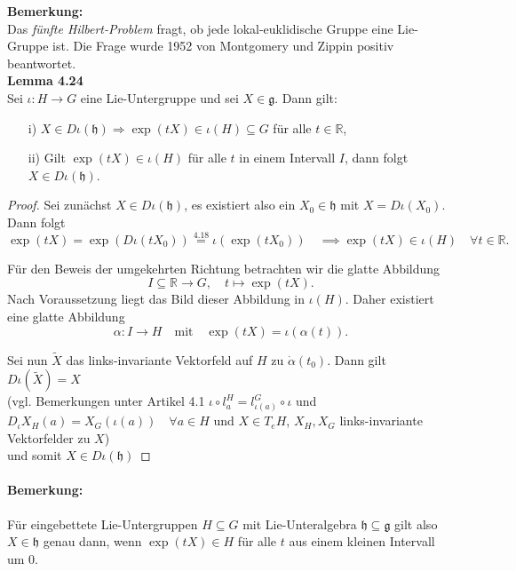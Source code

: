 \documentclass[fleqn, 12pt, letterpaper]{article}
\begin{document}
\textbf{Bemerkung:}\\
Das \emph{fünfte Hilbert-Problem} fragt, ob jede lokal-euklidische Gruppe eine Lie-Gruppe ist. Die Frage wurde 1952 von Montgomery und Zippin positiv beantwortet.\\

\textbf{Lemma 4.24}\\
Sei $\iota \colon H \to G$ eine Lie-Untergruppe und sei $X \in \mathfrak{g}$. Dann gilt:
\begin{itemize}
    \item[i)] $X \in D\iota(\mathfrak{h}) \Rightarrow \exp(tX) \in \iota(H) \subseteq G$ für alle $t \in \mathbb{R}$,
    \item[ii)] Gilt $\exp(tX) \in \iota(H)$ für alle $t$ in einem Intervall $I$, dann folgt $X \in D{\iota}(\mathfrak{h})$.
\end{itemize}

\begin{proof}
    Sei zunächst $X \in D\iota(\mathfrak{h})$, es existiert also ein $X_0 \in \mathfrak{h}$ mit $X = D{\iota}(X_0)$. Dann folgt
\[
\exp(tX) = \exp\left( D{\iota}(tX_0) \right) \overset{\text{4.18}}{=} \iota(\exp(tX_0)) \quad \implies \exp(tX) \in \iota(H) \quad \forall t \in \mathbb{R}.
\]

Für den Beweis der umgekehrten Richtung betrachten wir die glatte Abbildung
\[
I \subseteq \mathbb{R} \to G, \quad t \mapsto \exp(tX).
\]
Nach Voraussetzung liegt das Bild dieser Abbildung in $\iota(H)$. Daher existiert eine glatte Abbildung
\[
\alpha \colon I \to H \quad \text{mit} \quad \exp(tX) = \iota(\alpha(t)).
\]

Sei nun $\tilde{X}$ das links-invariante Vektorfeld auf $H$ zu $\dot{\alpha}(t_0)$. Dann gilt $D\iota(\tilde{X})=X$\\
(vgl. Bemerkungen unter Artikel 4.1 $\iota \circ l_a^H = l_{\iota(a)}^G \circ \iota$ und $D_\iota X_H(a)=X_G(\iota(a))\quad \forall a\in H$ und $X\in T_eH$, $X_H, X_G$ links-invariante Vektorfelder zu $X$)\\
und somit $X\in D\iota(\mathfrak{h})$
\end{proof}


\paragraph{Bemerkung:}
Für eingebettete Lie-Untergruppen $H \subseteq G$ mit Lie-Unteralgebra $\mathfrak{h} \subseteq \mathfrak{g}$ gilt also $X \in \mathfrak{h}$ genau dann, wenn $\exp(tX) \in H$ für alle $t$ aus einem kleinen Intervall um $0$.\\
\end{document}
